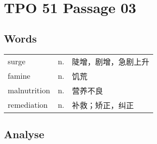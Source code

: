 \section{TPO 51 Passage 03}

\subsection{Words}

\begin{tabular}{lll}
    surge        & n. & 陡增，剧增，急剧上升 \\
    famine       & n. & 饥荒         \\
    malnutrition & n. & 营养不良       \\
    remediation  & n. & 补救；矫正，纠正   \\
\end{tabular}

\subsection{Analyse}

